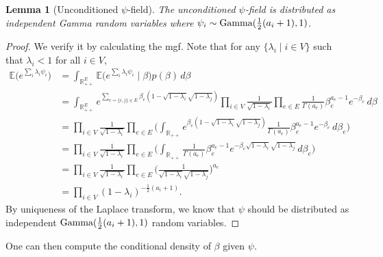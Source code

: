 \documentclass[a4paper, 11pt]{article}
\newcommand{\E}{\mathbb{E}}
\newcommand{\gam}{\textnormal{Gamma}}
\newtheorem{lem}[thm]{Lemma}
\begin{document}
\vspace{.5em}
\begin{lem}[Unconditioned $\psi$-field]
    The unconditioned $\psi$-field is distributed as independent Gamma random variables where $\psi_i\sim\gam(\frac{1}{2}(a_i+1), 1)$.
\end{lem}
\begin{proof}
    We verify it by calculating the mgf. Note that for any $\{\lambda_i\mid i\in V\}$ such that $\lambda_i<1$ for all $i\in V$, 
    \begin{align*}
        \E\big(e^{\sum_i\lambda_i\psi_i}\big)
        &= \int_{\mathbb{R}_{++}^E}\E\big(e^{\sum_i\lambda_i\psi_i}\mid \beta\big)p(\beta) \,d\beta\\
        &= \int_{\mathbb{R}_{++}^E}e^{\sum_{e=\{i,j\}\in E}\beta_e(1-\sqrt{1-\lambda_i}\sqrt{1-\lambda_j})}\prod_{i\in V} \frac{1}{\sqrt{1-\lambda_i}}\prod_{e\in E}\frac{1}{\Gamma(a_e)}\beta_e^{a_e-1}e^{-\beta_e}\,d\beta\\
        &= \prod_{i\in V} \frac{1}{\sqrt{1-\lambda_i}}\prod_{e\in E}\bigg(\int_{\mathbb{R}_{++}}e^{\beta_e(1-\sqrt{1-\lambda_i}\sqrt{1-\lambda_j})}\frac{1}{\Gamma(a_e)}\beta_e^{a_e-1}e^{-\beta_e}\,d\beta_e\bigg)\\
        &= \prod_{i\in V} \frac{1}{\sqrt{1-\lambda_i}}\prod_{e\in E}\bigg(\int_{\mathbb{R}_{++}}\frac{1}{\Gamma(a_e)}\beta_e^{a_e-1}e^{-\beta_e\sqrt{1-\lambda_i}\sqrt{1-\lambda_j}}\,d\beta_e\bigg)\\
        &= \prod_{i\in V} \frac{1}{\sqrt{1-\lambda_i}}\prod_{e\in E}\bigg(\frac{1}{\sqrt{1-\lambda_i}\sqrt{1-\lambda_j}}\bigg)^{a_e}\\
        &= \prod_{i\in V} (1-\lambda_i)^{-\frac{1}{2}(a_i+1)}.
    \end{align*}
    By uniqueness of the Laplace transform, we know that $\psi$ should be distributed as independent $\gam(\frac{1}{2}(a_i+1), 1)$ random variables. 
\end{proof}

One can then compute the conditional density of $\beta$ given $\psi$.
\end{document}

